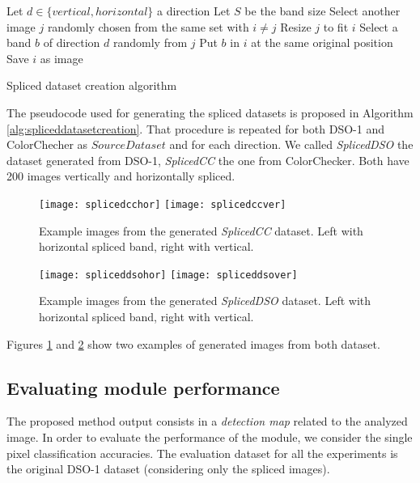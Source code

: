 \begin{algorithm}[!h]
\begin{algorithmic}[1]
\State Let $d \in \{vertical, horizontal\}$ a direction
\State Let $S$ be the band size
\State Select another image $j$ randomly chosen from the same set with $i \neq j$
\State Resize $j$ to fit $i$
\State Select a band $b$ of direction $d$ randomly from $j$
\State Put $b$ in $i$ at the same original position
\State Save $i$ as image
\EndFor
\end{algorithmic}\caption{Spliced dataset creation algorithm}\label{alg:spliceddatasetcreation}
\end{algorithm}

The pseudocode used for generating the spliced datasets is proposed in Algorithm \ref{alg:spliceddatasetcreation}. That procedure is repeated for both DSO-1 and ColorChecher as $SourceDataset$ and for each direction. We called \emph{SplicedDSO} the dataset generated from DSO-1, \emph{SplicedCC} the one from ColorChecker. Both have 200 images vertically and horizontally spliced.

\begin{figure}[!htb]
  \texttt{[image: splicedcchor]}
\endminipage\hfill
{}
  \texttt{[image: splicedccver]}
\endminipage
\caption{Example images from the generated \emph{SplicedCC} dataset. Left with horizontal spliced band, right with vertical.}\label{fig:splicedccsamples}
\end{figure}

\begin{figure}[!htb]
  \texttt{[image: spliceddsohor]}
\endminipage\hfill
{}
  \texttt{[image: spliceddsover]}
\endminipage
\caption{Example images from the generated \emph{SplicedDSO} dataset. Left with horizontal spliced band, right with vertical.}\label{fig:spliceddsosamples}
\end{figure}

Figures \ref{fig:splicedccsamples} and \ref{fig:spliceddsosamples} show two examples of generated images from both dataset. 

\subsection{Evaluating module performance}

The proposed method output consists in a\emph{ detection map} related to the analyzed image. In order to evaluate the performance of the module, we consider the single pixel classification accuracies. The evaluation dataset for all the experiments is the original DSO-1 dataset (considering only the spliced images).

